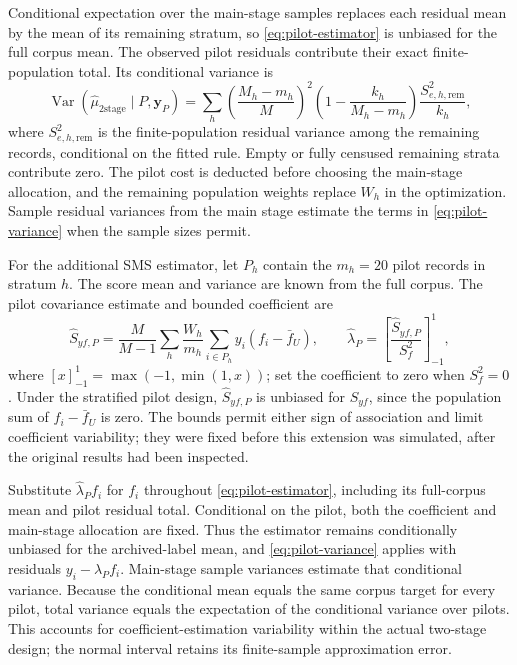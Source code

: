 \documentclass[11pt,a4paper]{article}
\newcommand{\Var}{\operatorname{Var}}
\begin{document}
Conditional expectation over the main-stage samples replaces each residual mean by the mean of its remaining stratum, so \eqref{eq:pilot-estimator} is unbiased for the full corpus mean. The observed pilot residuals contribute their exact finite-population total. Its conditional variance is
\begin{equation}
 \Var(\widehat\mu_{\mathrm{2stage}}\mid P,\boldsymbol y_P)
 =\sum_h\left(\frac{M_h-m_h}{M}\right)^2
     \left(1-\frac{k_h}{M_h-m_h}\right)
     \frac{S_{e,h,\mathrm{rem}}^2}{k_h},
 \label{eq:pilot-variance}
\end{equation}
where $S_{e,h,\mathrm{rem}}^2$ is the finite-population residual variance among the remaining records, conditional on the fitted rule. Empty or fully censused remaining strata contribute zero. The pilot cost is deducted before choosing the main-stage allocation, and the remaining population weights replace $W_h$ in the optimization. Sample residual variances from the main stage estimate the terms in \eqref{eq:pilot-variance} when the sample sizes permit.


For the additional SMS estimator, let $P_h$ contain the $m_h=20$ pilot records in stratum $h$. The score mean and variance are known from the full corpus. The pilot covariance estimate and bounded coefficient are
\begin{equation}
 \widehat S_{yf,P}=\frac{M}{M-1}\sum_h\frac{W_h}{m_h}
       \sum_{i\in P_h}y_i(f_i-\bar f_U),\qquad
 \widehat\lambda_P=\left[\frac{\widehat S_{yf,P}}{S_f^2}\right]_{-1}^{1},
 \label{eq:pilot-weight}
\end{equation}
where $[x]_{-1}^{1}=\max(-1,\min(1,x))$; set the coefficient to zero when $S_f^2=0$. Under the stratified pilot design, $\widehat S_{yf,P}$ is unbiased for $S_{yf}$, since the population sum of $f_i-\bar f_U$ is zero. The bounds permit either sign of association and limit coefficient variability; they were fixed before this extension was simulated, after the original results had been inspected.

Substitute $\widehat\lambda_P f_i$ for $f_i$ throughout \eqref{eq:pilot-estimator}, including its full-corpus mean and pilot residual total. Conditional on the pilot, both the coefficient and main-stage allocation are fixed. Thus the estimator remains conditionally unbiased for the archived-label mean, and \eqref{eq:pilot-variance} applies with residuals $y_i-\widehat\lambda_P f_i$. Main-stage sample variances estimate that conditional variance. Because the conditional mean equals the same corpus target for every pilot, total variance equals the expectation of the conditional variance over pilots. This accounts for coefficient-estimation variability within the actual two-stage design; the normal interval retains its finite-sample approximation error.
\end{document}
